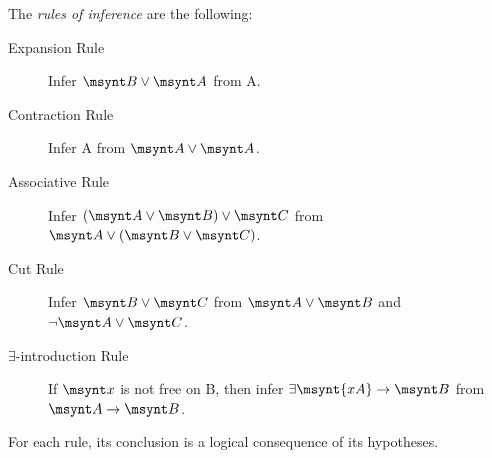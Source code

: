 \begin{definition}
	The \emph{rules of inference} are the following:
	\begin{description}
		\item[Expansion Rule] Infer $\msynt B \lor \msynt A$ from \synt A.
		\item[Contraction Rule] Infer \synt A from $\msynt A \lor \msynt A$.
		\item [Associative Rule] Infer $(\msynt A \lor \msynt B)\lor \msynt C$
		from $\msynt A \lor (\msynt B\lor \msynt C)$.
		\item [Cut Rule] Infer $\msynt B \lor \msynt C$ from 
		$\msynt A \lor \msynt B$ and $\lnot \msynt A \lor \msynt C$.
		\item [$\exists$-introduction Rule] If $\msynt x$ is not free on
		\synt B, then infer $\exists\msynt{xA}\to\msynt B$ from 
		$\msynt A \to\msynt B$.
	\end{description}
\end{definition}

\begin{fact}
	For each rule, its conclusion is a logical consequence of its hypotheses.
\end{fact}